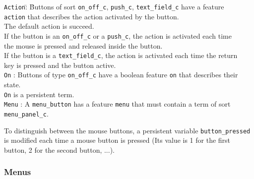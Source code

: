   \begin{tabbing}
  {\tt Action}\=: \= Buttons of sort \verb+on_off_c+, \verb+push_c+, 
                     \verb+text_field_c+ have a feature \\ 
              \>  \> {\tt action} that describes the action activated by
                     the button.\\
              \>  \> The default action is succeed.\\
              \>  \> If the button is an \verb+on_off_c+ or a
                     \verb+push_c+, the action is activated each time \\ 
              \>  \> the mouse is pressed and released inside 
                     the button.\\
	      \>  \> If the button is a \verb+text_field_c+, the
                     action is activated each time the return \\
              \>  \> key is pressed and the button active.\\ 
  
  {\tt On}    \>: \> Buttons of type \verb+on_off_c+ have a boolean
                     feature {\tt on} that describes their state.\\
              \>  \> {\tt On} is a persistent term.\\ 

  {\tt Menu}  \>: \> A \verb+menu_button+ has a feature {\tt menu} that must
                     contain a term of sort \\
              \>  \> \verb+menu_panel_c+.\\
  \end{tabbing} 

  To distinguish between the mouse buttons, a persistent variable
  \verb+button_pressed+ is modified each time a mouse button is pressed (Its
  value is 1 for the first button, 2 for the second button, ...).  
  

  \subsubsection{Menus}

